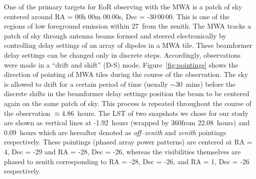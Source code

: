 \documentclass[preprint2,iop,numberedappendix]{emulateapj}
\begin{document}
One of the primary targets for EoR observing with the MWA is a patch of sky centered around RA = 00h 00m 00.00s, Dec = -30\arcdeg$\,$00\arcmin$\,$00. This is one of the regions of low foreground emission within 27\arcdeg$\,$ from the zenith. The MWA tracks a patch of sky through antenna beams formed and steered electronically by controlling delay settings of an array of dipoles in a MWA tile. These beamformer delay settings can be changed only in discrete steps. Accordingly, observations were made in a ``drift and shift'' (D-S) mode. Figure~\ref{fig:pointings} shows the direction of pointing of MWA tiles during the course of the observation. The sky is allowed to drift for a certain period of time (usually $\sim 30$~mins) before the discrete shifts in the beamformer delay settings position the beam to be centered again on the same patch of sky. This process is repeated throughout the course of the observation $\approx 4.86$~hours. The LST of two snapshots we chose for our study are shown as vertical lines at -1.92~hours (wrapped by 360\arcdeg from 22.08~hours) and 0.09~hours which are hereafter denoted as {\it off--zenith} and {\it zenith} pointings respectively. These pointings (phased array power patterns) are centered at RA = 4, Dec = -29 and RA = -28, Dec = -26, whereas the visibilities themselves are phased to zenith corresponding to RA = -28, Dec = -26, and RA = 1, Dec = -26 respectively. 
\end{document}
